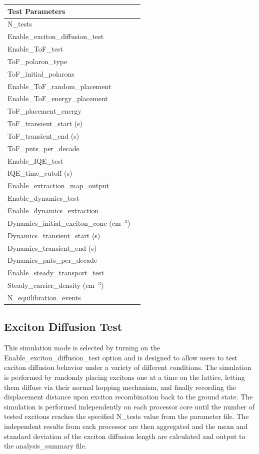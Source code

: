 \documentclass[%
 reprint,onecolumn,notitlepage,
superscriptaddress,longbibliography,
 amsmath,amssymb,
 aps,rmp,floatfix,
]{revtex4-1}
\begin{document}
\begin{center}
\begin{tabular}{ l l }
\hline
Test Parameters & \\
\hline
N\_tests & \\
Enable\_exciton\_diffusion\_test & \\
Enable\_ToF\_test & \\
ToF\_polaron\_type & \\
ToF\_initial\_polarons & \\
Enable\_ToF\_random\_placement & \\
Enable\_ToF\_energy\_placement & \\
ToF\_placement\_energy & \\
ToF\_transient\_start (s) & \\
ToF\_transient\_end (s) & \\
ToF\_pnts\_per\_decade & \\
Enable\_IQE\_test & \\
IQE\_time\_cutoff (s) & \\
Enable\_extraction\_map\_output & \\
Enable\_dynamics\_test & \\
Enable\_dynamics\_extraction & \\
Dynamics\_initial\_exciton\_conc (cm$^{-3}$) & \\
Dynamics\_transient\_start (s) & \\
Dynamics\_transient\_end (s) & \\
Dynamics\_pnts\_per\_decade & \\
Enable\_steady\_transport\_test & \\
Steady\_carrier\_density (cm$^{-3}$) & \\
N\_equilibration\_events & \\
\end{tabular}
\end{center}

\subsection{Exciton Diffusion Test}

This simulation mode is selected by turning on the Enable\_exciton\_diffusion\_test option and is designed to allow users to test exciton diffusion behavior under a variety of different conditions.
The simulation is performed by randomly placing excitons one at a time on the lattice, letting them diffuse via their normal hopping mechanism, and finally recording the displacement distance upon exciton recombination back to the ground state.
The simulation is performed independently on each processor core until the number of tested excitons reaches the specified N\_tests value from the parameter file.
The independent results from each processor are then aggregated and the mean and standard deviation of the exciton diffusion length are calculated and output to the analysis\_summary file.
\end{document}
